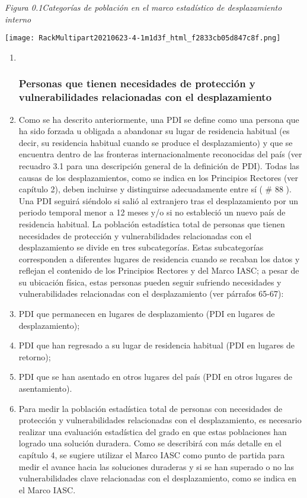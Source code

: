 \documentclass[
]{book}
\begin{document}
\emph{Figura 0.1Categorías de población en el marco estadístico de desplazamiento interno}

\texttt{[image: RackMultipart20210623-4-1m1d3f\_html\_f2833cb05d847c8f.png]}

\begin{enumerate}
\def\labelenumi{\arabic{enumi}.}
\item ~
  \hypertarget{personas-que-tienen-necesidades-de-protecciuxf3n-y-vulnerabilidades-relacionadas-con-el-desplazamiento}{%
  \subsubsection{Personas que tienen necesidades de protección y vulnerabilidades relacionadas con el desplazamiento}\label{personas-que-tienen-necesidades-de-protecciuxf3n-y-vulnerabilidades-relacionadas-con-el-desplazamiento}}
\item
  Como se ha descrito anteriormente, una PDI se define como una persona que ha sido forzada u obligada a abandonar su lugar de residencia habitual (es decir, su residencia habitual cuando se produce el desplazamiento) y que se encuentra dentro de las fronteras internacionalmente reconocidas del país (ver recuadro 3.1 para una descripción general de la definición de PDI). Todas las causas de los desplazamientos, como se indica en los Principios Rectores (ver capítulo 2), deben incluirse y distinguirse adecuadamente entre sí (
  \# 88
  ). Una PDI seguirá siéndolo si salió al extranjero tras el desplazamiento por un periodo temporal menor a 12 meses y/o si no estableció un nuevo país de residencia habitual. La población estadística total de personas que tienen necesidades de protección y vulnerabilidades relacionadas con el desplazamiento se divide en tres subcategorías. Estas subcategorías corresponden a diferentes lugares de residencia cuando se recaban los datos y reflejan el contenido de los Principios Rectores y del Marco IASC; a pesar de su ubicación física, estas personas pueden seguir sufriendo necesidades y vulnerabilidades relacionadas con el desplazamiento (ver párrafos 65-67):
\item
  PDI que permanecen en lugares de desplazamiento (PDI en lugares de desplazamiento);
\item
  PDI que han regresado a su lugar de residencia habitual (PDI en lugares de retorno);
\item
  PDI que se han asentado en otros lugares del país (PDI en otros lugares de asentamiento).
\item
  Para medir la población estadística total de personas con necesidades de protección y vulnerabilidades relacionadas con el desplazamiento, es necesario realizar una evaluación estadística del grado en que estas poblaciones han logrado una solución duradera. Como se describirá con más detalle en el capítulo 4, se sugiere utilizar el Marco IASC como punto de partida para medir el avance hacia las soluciones duraderas y si se han superado o no las vulnerabilidades clave relacionadas con el desplazamiento, como se indica en el Marco IASC.
\end{enumerate}
\end{document}
